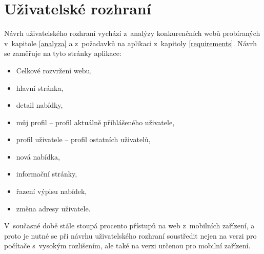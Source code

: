 \chapter{Uživatelské rozhraní}
\label{nur}

Návrh uživatelského rozhraní vychází z~analýzy konkurenčních webů probíraných v~kapitole \ref{analyza} a z~požadavků na aplikaci z~kapitoly \ref{requirements}. Návrh se zaměřuje na tyto stránky aplikace:
\begin{itemize}
    \item Celkové rozvržení webu,
	\item hlavní stránka,
	\item detail nabídky,
	\item můj profil -- profil aktuálně přihlášeného uživatele,
	\item profil uživatele -- profil ostatních uživatelů,
	\item nová nabídka,
	\item informační stránky,
	\item řazení výpisu nabídek,
	\item změna adresy uživatele.
\end{itemize}
V~současné době stále stoupá procento přístupů na web z~mobilních zařízení, a proto je nutné se při návrhu uživatelského rozhraní soustředit nejen na verzi pro počítače s~vysokým rozlišením, ale také na verzi určenou pro mobilní zařízení.








%





